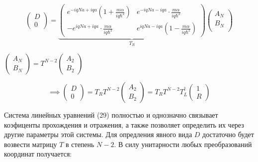 \documentclass[a4paper, 12pt]{article}
\begin{document}
	\begin{equation}
		\left(\begin{array}{c}
			D \\
			0
		\end{array}\right) =  \underbrace{\left(\begin{array}{cc}
			e^{-iqNa + iqa} \left(1 + \frac{m\alpha}{iq\hbar^2}\right) & e^{-iqNa - iqa} \cdot \frac{m\alpha}{iq\hbar^2} \\
			- e^{iqNa + iqa} \cdot \frac{m\alpha}{iq\hbar^2} & e^{iqNa - iqa} \left(1 - \frac{m\alpha}{iq\hbar^2}\right)
		\end{array}\right)}_{T_R} \left(\begin{array}{c}
			A_N \\
			B_N \\
		\end{array}\right)
	\end{equation}
	
	\begin{center}
		$\left(\begin{array}{c}
			A_N \\
			B_N
		\end{array}\right) = T^{N-2} \left(\begin{array}{c}
			A_2 \\
			B_2 
		\end{array}\right) $
	\end{center}
	
	\begin{equation}
		\implies \left(\begin{array}{c}
			D \\
			0
		\end{array}\right) = T_R T^{N-2} \left(\begin{array}{c}
			A_2 \\
			B_2 
		\end{array}\right) = T_R T^{N-2} T_L^\dag \left(\begin{array}{c}
		1 \\
		R 
		\end{array}\right)
	\end{equation}
	
	\quad Система линейных уравнений (29) полностью и однозначно связывает коэфиценты прохождения и отражения, а также позволяет определить их через другие параметры этой системы. Для опредления явного вида $D$ достаточно будет возвести матрицу $T$ в степень $N-2$.  В силу унитарности любых преобразований координат получается: 
	
\end{document}
